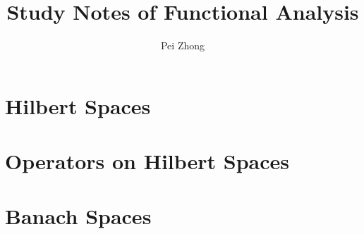 \documentclass[12pt,oneside]{book} %
\begin{document}
\title{\bf \huge Study Notes of Functional Analysis}
\author{Pei Zhong}

\maketitle


\tableofcontents

\begin{spacing}{1}









% 
\part{Hilbert Spaces}





% 

\part{Operators on Hilbert Spaces}





\part{Banach Spaces}











% 


\end{spacing}
\end{document}

